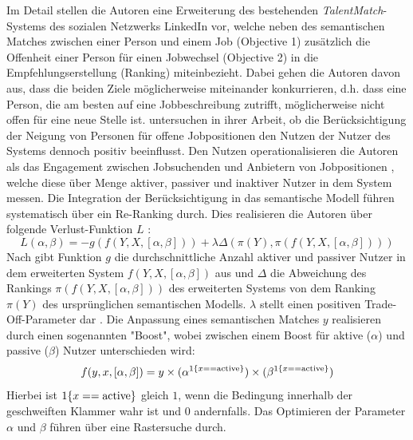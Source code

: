 Im Detail stellen die Autoren eine Erweiterung des bestehenden \textit{TalentMatch}-Systems des sozialen Netzwerks LinkedIn vor, welche neben des semantischen Matches \cite[S. 2]{jannach:2:inproceedings} zwischen einer Person und einem Job (Objective 1) zusätzlich die Offenheit einer Person für einen Jobwechsel (Objective 2) in die Empfehlungserstellung (Ranking) miteinbezieht.
Dabei gehen die Autoren davon aus, dass die beiden Ziele möglicherweise miteinander konkurrieren, d.h. dass eine Person, die am besten auf eine Jobbeschreibung zutrifft, möglicherweise nicht offen für eine neue Stelle ist.
\textcite[S. 12]{rodriguez:inproceedings} untersuchen in ihrer Arbeit, ob die Berücksichtigung der Neigung von Personen für offene Jobpositionen den Nutzen der Nutzer des Systems dennoch positiv beeinflusst.
Den Nutzen operationalisieren die Autoren als das Engagement zwischen Jobsuchenden und Anbietern von Jobpositionen \cite[S. 14]{rodriguez:inproceedings}, welche diese über Menge aktiver, passiver und inaktiver Nutzer in dem System messen.
Die Integration der Berücksichtigung in das semantische Modell führen \textcite[S. 15]{rodriguez:inproceedings} systematisch über ein Re-Ranking durch.
Dies realisieren die Autoren über folgende Verlust-Funktion $L$ \cite[S. 13]{rodriguez:inproceedings}:
\begin{equation}\label{eq30}
    L(\alpha ,\beta) = -g(f(Y, X, [\alpha , \beta])) + \lambda \Delta (\pi (Y), \pi (f(Y,X,[\alpha ,\beta])))
\end{equation}
Nach \textcite[S. 15]{rodriguez:inproceedings} gibt Funktion $g$ die durchschnittliche Anzahl aktiver und passiver Nutzer in dem erweiterten System $f(Y, X, [\alpha , \beta])$ aus und $\Delta$ die Abweichung des Rankings $\pi (f(Y,X,[\alpha ,\beta]))$ des erweiterten Systems von dem Ranking $\pi (Y)$ des ursprünglichen semantischen Modells.
$\lambda$ stellt einen positiven Trade-Off-Parameter dar \cite[S. 13]{rodriguez:inproceedings}.
Die Anpassung eines semantischen Matches $y$ realisieren \textcite[S. 15]{rodriguez:inproceedings} durch einen sogenannten "Boost", wobei zwischen einem Boost für aktive ($\alpha$) und passive ($\beta$) Nutzer unterschieden wird:
\begin{equation}\label{eq31}
    f(y,x,[\alpha ,\beta]) = y \times (\alpha^{1\{{x == \textnormal{active}\}}}) \times (\beta^{1\{{x == \textnormal{active}\}}})
\end{equation}
Hierbei ist $1\{x == \textnormal{active}\}$ gleich $1$, wenn die Bedingung innerhalb der geschweiften Klammer wahr ist und $0$ andernfalls.
Das Optimieren der Parameter $\alpha$ und $\beta$ führen \textcite[S. 15]{rodriguez:inproceedings} über eine Rastersuche durch.

